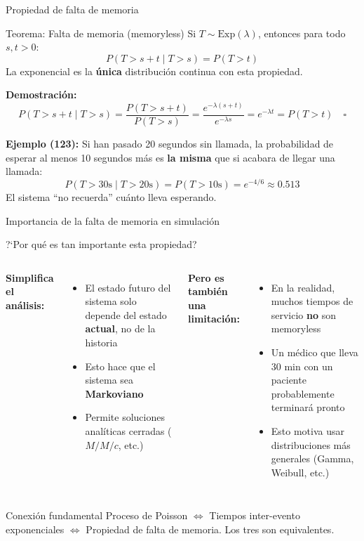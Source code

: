 \documentclass[aspectratio=1610, 9pt]{beamer}
\begin{document}
\begin{frame}{Propiedad de falta de memoria}

\begin{block}{Teorema: Falta de memoria (memoryless)}
Si $T \sim \text{Exp}(\lambda)$, entonces para todo $s, t > 0$:
\[
P(T > s + t \mid T > s) = P(T > t)
\]
La exponencial es la \textbf{\'{u}nica} distribuci\'{o}n continua con esta propiedad.
\end{block}

\vspace{0.2cm}
\textbf{Demostraci\'{o}n:}
\[
P(T > s+t \mid T > s) = \frac{P(T > s+t)}{P(T > s)} = \frac{e^{-\lambda(s+t)}}{e^{-\lambda s}} = e^{-\lambda t} = P(T > t) \quad \square
\]

\vspace{0.2cm}
\textbf{Ejemplo (123):} Si han pasado 20 segundos sin llamada, la probabilidad de esperar al menos 10 segundos m\'{a}s es \textbf{la misma} que si acabara de llegar una llamada:
\[
P(T > 30\text{s} \mid T > 20\text{s}) = P(T > 10\text{s}) = e^{-4/6} \approx 0.513
\]
El sistema ``no recuerda'' cu\'{a}nto lleva esperando.
\end{frame}

\begin{frame}{Importancia de la falta de memoria en simulaci\'{o}n}

?`Por qu\'{e} es tan importante esta propiedad?

\vspace{0.3cm}
\begin{columns}
\textbf{Simplifica el an\'{a}lisis:}
\begin{itemize}
    \item El estado futuro del sistema solo depende del estado \textbf{actual}, no de la historia
    \item Esto hace que el sistema sea \textbf{Markoviano}
    \item Permite soluciones anal\'{i}ticas cerradas ($M/M/c$, etc.)
\end{itemize}

\textbf{Pero es tambi\'{e}n una limitaci\'{o}n:}
\begin{itemize}
    \item En la realidad, muchos tiempos de servicio \textbf{no} son memoryless
    \item Un m\'{e}dico que lleva 30 min con un paciente probablemente terminar\'{a} pronto
    \item Esto motiva usar distribuciones m\'{a}s generales (Gamma, Weibull, etc.)
\end{itemize}
\end{columns}

\vspace{0.4cm}
\begin{alertblock}{Conexi\'{o}n fundamental}
Proceso de Poisson $\Leftrightarrow$ Tiempos inter-evento exponenciales $\Leftrightarrow$ Propiedad de falta de memoria. Los tres son equivalentes.
\end{alertblock}
\end{frame}
\end{document}
